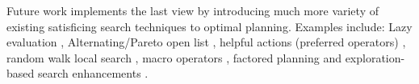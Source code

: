 Future work implements the last view by introducing much more variety of
existing satisficing search techniques to optimal planning. Examples
include: Lazy evaluation \cite{richter2010lama}, Alternating/Pareto open
list \cite{RogerH10}, helpful actions (preferred operators) \cite{Hoffmann01},
random walk local search \cite{nakhost2009monte}, macro operators
\cite{Botea2005,ChrpaVM15}, factored planning
\cite{amir2003factored,brafman2006factored,Asai2015} and
exploration-based search enhancements
\cite{valenzano2014comparison,xie14type,Valenzano2016}.

